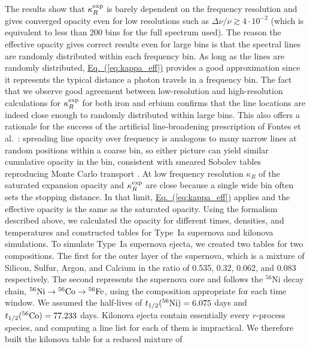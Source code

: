\documentclass[final,5p,times,twocolumn]{elsarticle}
\DeclareRobustCommand{\eqnref}[1]{\hyperref[#1]{Eq.~(\ref*{#1})}}
\begin{document}
    The results show that $\kappa_R^{\rm exp}$ is barely dependent on the frequency resolution
    and gives converged opacity even for low resolutions such as 
    $\Delta\nu/\nu \gtrsim 4\cdot 10^{-2}$ (which is equivalent to less than 200 bins for the full spectrum used).
    The reason the effective opacity gives correct results even for large bins is that the spectral lines are
    randomly distributed within each frequency bin. As long as the lines are randomly 
    distributed, \eqnref{eq:kappa_eff} provides a good approximation since it represents the typical distance
    a photon travels in a frequency bin. The fact that we observe good agreement between low-resolution and
    high-resolution calculations for $\kappa_R^{\rm exp}$ for both iron and erbium confirms 
    that the line locations are indeed close enough to randomly distributed within large bins. 
    This also offers a rationale for the success of the artificial line-broadening prescription
    of Fontes et al.\ \cite{fontes2015opacity,fontes2017linesmeared}:
    spreading line opacity over frequency is analogous to many narrow lines at random positions within
    a coarse bin, so either picture can yield similar cumulative opacity in the bin, 
    consistent with smeared Sobolev tables reproducing Monte Carlo transport \cite{fontes2020opacity}.
    At low frequency resolution $\kappa_R$ of the saturated expansion opacity and
    $\kappa_R^{\rm exp}$ are close because a single wide bin often sets the stopping distance. In that limit,
    \eqnref{eq:kappa_eff} applies and the effective opacity is the same as the saturated opacity.
    Using the formalism described above, we calculated the opacity for different times,
    densities, and temperatures and constructed tables for Type~Ia supernova and kilonova
    simulations.
    To simulate Type~Ia supernova ejecta, we created two tables for two compositions.
    The first for the outer layer of the supernova, which is a mixture of Silicon, Sulfur, Argon, and Calcium 
    in the ratio of 0.535, 0.32, 0.062, and 0.083 respectively.
    The second represents the supernova core and follows the $^{56}$Ni decay chain,
    $^{56}{\rm Ni}\rightarrow{}^{56}{\rm Co}\rightarrow{}^{56}{\rm Fe}$, using the composition appropriate
    for each time window. We assumed the half-lives of 
    $t_{1/2}(^{56}{\rm Ni}) = 6.075$ days and $t_{1/2}(^{56}{\rm Co}) = 77.233$ days.
    Kilonova ejecta contain essentially every $r$-process species, and computing a line list for
    each of them is impractical. We therefore built the kilonova table for a reduced mixture of
\end{document}
